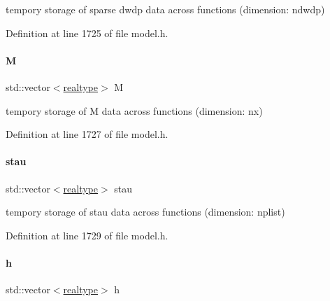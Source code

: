 tempory storage of sparse dwdp data across functions (dimension\+: ndwdp) 

Definition at line 1725 of file model.\+h.

\mbox{\label{classamici_1_1_model_a0a114d4a6ddc9469fe5e5b4a31317d89}} 
\paragraph{\texorpdfstring{M}{M}}
{\footnotesize\ttfamily std\+::vector$<$\mbox{\hyperlink{namespaceamici_a1bdce28051d6a53868f7ccbf5f2c14a3}{realtype}}$>$ M\hspace{0.3cm}{\ttfamily [protected]}}

tempory storage of M data across functions (dimension\+: nx) 

Definition at line 1727 of file model.\+h.

\mbox{\label{classamici_1_1_model_a989f1b7cc176a86d9684f4ccecb16b0d}} 
\paragraph{\texorpdfstring{stau}{stau}}
{\footnotesize\ttfamily std\+::vector$<$\mbox{\hyperlink{namespaceamici_a1bdce28051d6a53868f7ccbf5f2c14a3}{realtype}}$>$ stau\hspace{0.3cm}{\ttfamily [protected]}}

tempory storage of stau data across functions (dimension\+: nplist) 

Definition at line 1729 of file model.\+h.

\mbox{\label{classamici_1_1_model_a0e4df9c10406b35bd54f6f839322ca87}} 
\paragraph{\texorpdfstring{h}{h}}
{\footnotesize\ttfamily std\+::vector$<$\mbox{\hyperlink{namespaceamici_a1bdce28051d6a53868f7ccbf5f2c14a3}{realtype}}$>$ h\hspace{0.3cm}{\ttfamily [protected]}}

